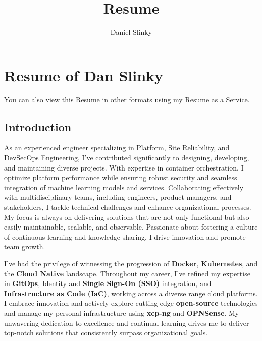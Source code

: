 \documentclass[
]{article}
\author{}
\date{}
\title{Resume}
\author{Daniel Slinky}
\date{}
\begin{document}

\hypertarget{simple-markdown-resume-of-dan-slinky-material-linkedin-simple-github-material-email}{%
\section{\texorpdfstring{\faMarkdown Resume of Dan Slinky
\href{https://linkedin.com/in/danslinky}{\faLinkedin}
\href{https://github.com/danslinky}{\faGithub}
\href{mailto:sysadmin@danslinky.co.uk}{\faEnvelope}}{ Resume of Dan Slinky   }}\label{simple-markdown-resume-of-dan-slinky-material-linkedin-simple-github-material-email}}

You can also view this Resume in other formats using my
\href{https://rtfm.danslinky.co.uk/resumes}{Resume as a Service}.

\hypertarget{fontawesome-solid-terminal-introduction}{%
\subsection{\texorpdfstring{\faTerminal
Introduction}{ Introduction}}\label{fontawesome-solid-terminal-introduction}}

As an experienced engineer specializing in Platform, Site Reliability,
and DevSecOps Engineering, I've contributed significantly to designing,
developing, and maintaining diverse projects. With expertise in
container orchestration, I optimize platform performance while ensuring
robust security and seamless integration of machine learning models and
services. Collaborating effectively with multidisciplinary teams,
including engineers, product managers, and stakeholders, I tackle
technical challenges and enhance organizational processes. My focus is
always on delivering solutions that are not only functional but also
easily maintainable, scalable, and observable. Passionate about
fostering a culture of continuous learning and knowledge sharing, I
drive innovation and promote team growth.

I've had the privilege of witnessing the progression of \faDocker
\textbf{Docker}, \faDharmachakra \textbf{Kubernetes}, and the
\textbf{Cloud Native} landscape. Throughout my career, I've refined my
expertise in \textbf{GitOps}, Identity and \textbf{Single Sign-On (SSO)}
integration, and \textbf{Infrastructure as Code (IaC)}, working across a
diverse range cloud platforms. I embrace innovation and actively explore
cutting-edge \textbf{open-source} technologies and manage my personal
infrastructure using \textbf{xcp-ng} and \textbf{OPNSense}. My
unwavering dedication to excellence and continual learning drives me to
deliver top-notch solutions that consistently surpass organizational
goals.
\end{document}
